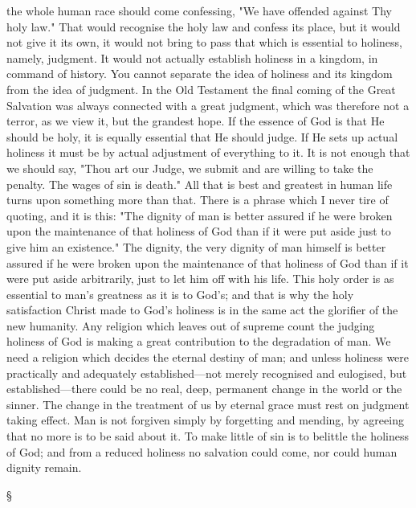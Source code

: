 \documentclass[12pt,letterpaper,oneside]{book}
\begin{document}
the whole human race should come confessing, 
"We have offended against Thy holy law." 
That would recognise the holy law and confess 
its place, but it would not give it its own, it 
would not bring to pass that which is essential 
to holiness, namely, judgment. It would not 
actually establish holiness in a kingdom, in 
command of history. You cannot separate the 
idea of holiness and its kingdom from the idea 
of judgment. In the Old Testament the final 
coming of the Great Salvation was always connected 
with a great judgment, which was 
therefore not a terror, as we view it, but the 
grandest hope. If the essence of God is that He 
should be holy, it is equally essential that He 
should judge. If He sets up actual holiness it 
must be by actual adjustment of everything 
to it. It is not enough that we should say, 
"Thou art our Judge, we submit and are willing 
to take the penalty. The wages of sin is 
death." All that is best and greatest in human 
life turns upon something more than that. 
There is a phrase which I never tire of quoting, 
and it is this: "The dignity of man is better 
assured if he were broken upon the maintenance 
of that holiness of God than if it 
were put aside just to give him an existence." 
The dignity, the very dignity of man himself 
is better assured if he were broken upon the 
maintenance of that holiness of God than if it 
were put aside arbitrarily, just to let him off 
with his life. This holy order is as essential 
to man's greatness as it is to God's; and that is 
why the holy satisfaction Christ made to God's 
holiness is in the same act the glorifier of 
the new humanity. Any religion which leaves 
out of supreme count the judging holiness 
of God is making a great contribution to the 
degradation of man. We need a religion which 
decides the eternal destiny of man; and unless 
holiness were practically and adequately established---not
merely recognised and eulogised, 
but established---there could be no real, deep, 
permanent change in the world or the sinner. 
The change in the treatment of us by eternal 
grace must rest on judgment taking effect. 
Man is not forgiven simply by forgetting and 
mending, by agreeing that no more is to be 
said about it. To make little of sin is to 
belittle the holiness of God; and from a reduced 
holiness no salvation could come, nor 
could human dignity remain. 

\begin{center}
\S
\end{center}
\end{document}

